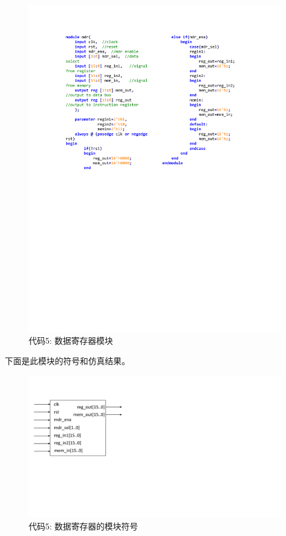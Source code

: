 \documentclass[titlepage, 11pt]{article}
\begin{document}
		\begin{figure}[H]
			\centering
			\includegraphics[scale=0.856]{22.pdf}
			\caption*{代码5: 数据寄存器模块}
		\end{figure}
		下面是此模块的符号和仿真结果。
		\begin{figure}[H]
			\includegraphics[scale=0.5]{23.pdf}
			\caption*{代码5: 数据寄存器的模块符号}
		\end{figure}
\end{document}

